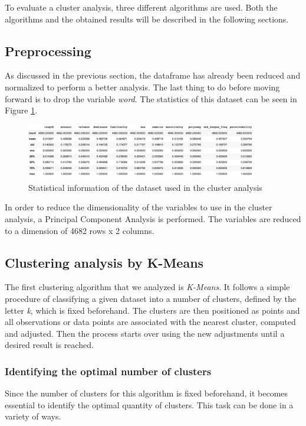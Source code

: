 \documentclass[a4paper,11pt,dvipsnames]{article}
\begin{document}
To evaluate a cluster analysis, three different algorithms are used. Both the algorithms and the obtained results will be described in the following sections.

\subsection{Preprocessing}
As discussed in the previous section, the dataframe has already been reduced and normalized to perform a better analysis. The last thing to do before moving forward is to drop the variable \textit{word}. The statistics of this dataset can be seen in Figure \ref{tab:stat2}.

\begin{figure}[h]
    \centering
    \includegraphics[width=0.9\textwidth]{stat2.png}
    \caption{Statistical information of the dataset used in the cluster analysis}
    \label{tab:stat2}
\end{figure}

In order to reduce the dimensionality of the variables to use in the cluster analysis, a Principal Component Analysis is performed. The variables are reduced to a dimension of 4682 rows x 2 columns.

\subsection{Clustering analysis by K-Means}
The first clustering algorithm that we analyzed is \textit{K-Means}. It follows a simple procedure of classifying a given dataset into a number of clusters, defined by the letter \textit{k}, which is fixed beforehand. The clusters are then positioned as points and all observations or data points are associated with the nearest cluster, computed and adjusted. Then the process starts over using the new adjustments until a desired result is reached.

\subsubsection{Identifying the optimal number of clusters}
Since the number of clusters for this algorithm is fixed beforehand, it becomes essential to identify the optimal quantity of clusters. This task can be done in a variety of ways.
\end{document}
